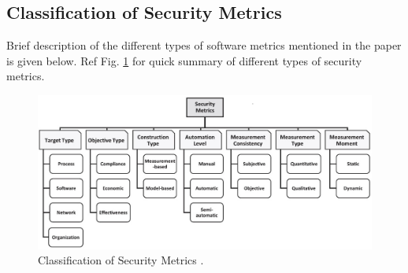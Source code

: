 \documentclass[pdftex,english,oribibl]{llncs}
\begin{document}
\subsection{Classification of Security Metrics}
Brief description of the different types of software metrics mentioned in the paper \cite{8017389_Ramos} is given below. Ref Fig. \ref{fig:security_metric_types} for quick summary of different types of security metrics.

\begin{figure}[h]
	\centering\includegraphics[width=\linewidth]{figures/security_metric_types.jpg}
	\caption{Classification of Security Metrics \cite{8017389_Ramos}.}
	\label{fig:security_metric_types}
\end{figure}
\end{document}
